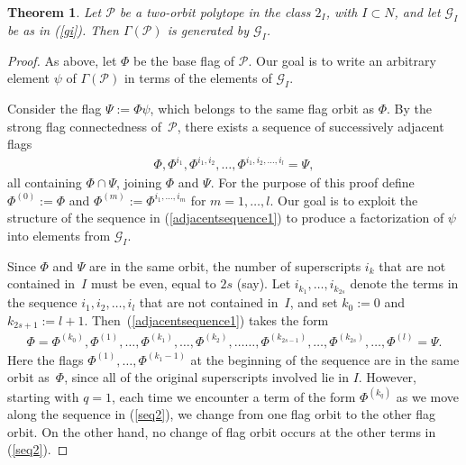 \documentclass[10pt,a4paper]{amsart}
\newtheorem{theorem}{Theorem}
\begin{document}
\begin{theorem}
\label{generators}
Let $\mathcal{P}$ be a two-orbit polytope in the class $2_I$, with $I\subset N$, and let $\mathcal{G}_{I}$ be as in (\ref{gi}). Then $\Gamma(\mathcal{P})$ is generated by $\mathcal{G}_{I}$.
\end{theorem}

\begin{proof}
As above, let $\Phi$ be the base flag of $\mathcal{P}$. Our goal is to write an arbitrary element $\psi$ of $\Gamma(\mathcal{P})$ in terms of the elements of $\mathcal{G}_{I}$. 

Consider the flag $\Psi:=\Phi\psi$, which belongs to the same flag orbit as $\Phi$. By the strong flag connectedness of~$\mathcal{P}$, there exists a sequence of successively adjacent flags 
\begin{eqnarray}
\label{adjacentsequence1}
\Phi, \Phi^{i_1}, \Phi^{i_1, i_2}, \dots, \Phi^{i_1, i_2, \dots, i_l}=\Psi,
\end{eqnarray}
all containing $\Phi \cap \Psi$, joining $\Phi$ and $\Psi$.  For the purpose of this proof define $\Phi^{(0)}:=\Phi$ and $\Phi^{(m)}:= \Phi^{i_1,\dots, i_m}$ for $m=1,\ldots,l$. Our goal is to exploit the structure of the sequence in (\ref{adjacentsequence1}) to produce a factorization of $\psi$ into elements from $\mathcal{G}_{I}$.
 
Since $\Phi$ and $\Psi$ are in the same orbit, the number of superscripts $i_k$ that are not contained in~$I$ must be even, equal to $2s$ (say). Let $i_{k_1}, \ldots, i_{k_{2s}}$ denote the terms in the sequence $i_1, i_2, \ldots, i_l$ that are not contained in~$I$, and set $k_0:=0$ and $k_{2s+1}:=l+1$. Then~(\ref{adjacentsequence1}) takes the form
\begin{eqnarray}
\label{seq2}
\Phi=\Phi^{(k_0)},  \Phi^{(1)}, \dots,  \Phi^{(k_1)},\ldots, \Phi^{(k_2)}, \ldots\ldots, \Phi^{(k_{2s-1})}, \ldots, \Phi^{(k_{2s})}, \ldots, \Phi^{(l)} = \Psi.
\end{eqnarray}
Here the flags $\Phi^{(1)}, \ldots, \Phi^{(k_1-1)}$ at the beginning of the sequence are in the same orbit as~$\Phi$, since all of the original superscripts involved lie in $I$. However, starting with $q=1$, each time we encounter a term of the form $\Phi^{(k_q)}$ as we move along the sequence in (\ref{seq2}), we change from one flag orbit to the other flag orbit. On the other hand, no change of flag orbit occurs at the other terms in (\ref{seq2}).


\end{proof}
\end{document}
